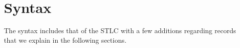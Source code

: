 \begin{fence}
\begin{code}
\AgdaSpace{}%
\AgdaSpace{}%
\AgdaSymbol{(}\AgdaSymbol{;}\AgdaSpace{}%
\AgdaSymbol{)}\<%
\\
\>[0]\AgdaSpace{}%
\AgdaSpace{}%
\AgdaSpace{}%
\<%
\\
\>[0]\AgdaSpace{}%
\AgdaSpace{}%
\AgdaSpace{}%
\AgdaSymbol{(}\AgdaSymbol{;}\AgdaSpace{}%
\AgdaSymbol{;}\AgdaSpace{}%
\AgdaSymbol{;}\AgdaSpace{}%
\AgdaSymbol{;}\AgdaSpace{}%
\AgdaSymbol{)}\<%
\\
\>[0]\AgdaSpace{}%
\AgdaSpace{}%
\AgdaSpace{}%
\AgdaSpace{}%
\AgdaSymbol{(}\AgdaSymbol{;}\AgdaSpace{}%
\AgdaSymbol{;}\AgdaSpace{}%
\AgdaSymbol{;}\AgdaSpace{}%
\AgdaSymbol{)}\<%
\end{code}
\end{fence}

\hypertarget{syntax}{%
\section{Syntax}\label{syntax}}

The syntax includes that of the STLC with a few additions regarding
records that we explain in the following sections.

